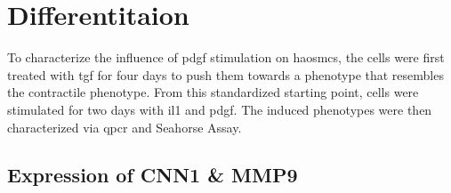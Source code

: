 \section{Differentitaion}
\label{sec:differentiation}
To characterize the influence of \ac{pdgf} stimulation on \acp{haosmc}, the cells were first treated with \ac{tgf} for four days to push them towards a phenotype that resembles the contractile phenotype. From this standardized starting point, cells were stimulated for two days with \ac{il1} and \ac{pdgf}. The induced phenotypes were then characterized via \ac{qpcr} and Seahorse Assay.

    \subsection{Expression of CNN1 \& MMP9}
    \label{subsec:qPCR}
